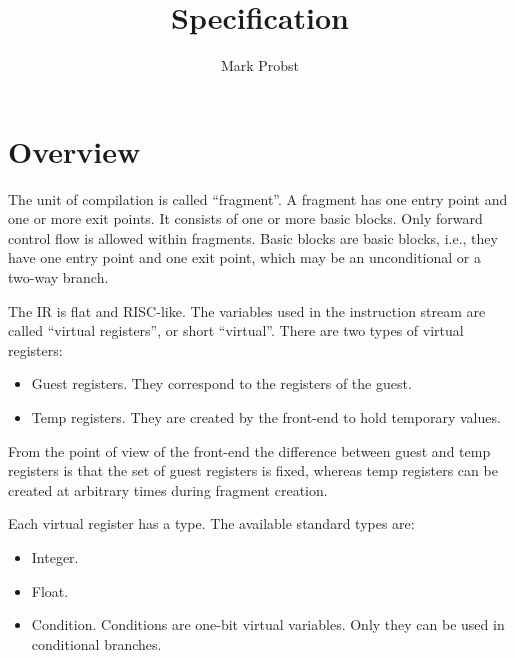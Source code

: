 \documentclass{article}
\title{Specification}
\author{Mark Probst}
\date{}
\begin{document}
\maketitle

\section{Overview}

The unit of compilation is called ``fragment''.  A fragment has one
entry point and one or more exit points.  It consists of one or more
basic blocks.  Only forward control flow is allowed within fragments.  Basic blocks are basic
blocks, i.e., they have one entry point and one exit point, which may
be an unconditional or a two-way branch.

The IR is flat and RISC-like.  The variables used in the instruction
stream are called ``virtual registers'', or short ``virtual''.  There
are two types of virtual registers:

\begin{itemize}
\item Guest registers.  They correspond to the registers of the guest.

\item Temp registers.  They are created by the front-end to hold
    temporary values.
\end{itemize}

From the point of view of the front-end the difference between guest
and temp registers is that the set of guest registers is
fixed, whereas temp registers can be created at arbitrary times
during fragment creation.

Each virtual register has a type.  The available standard types are:

\begin{itemize}
\item Integer.

\item Float.

\item Condition.  Conditions are one-bit virtual variables.  Only they
    can be used in conditional branches.
\end{itemize}
\end{document}
